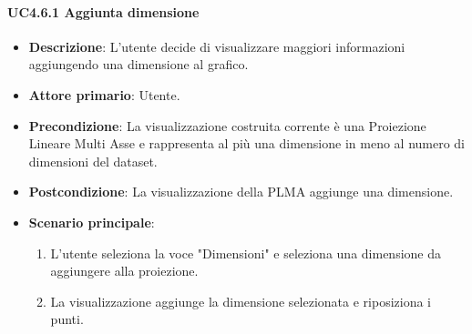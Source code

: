 \paragraph{UC4.6.1 Aggiunta dimensione}
\label{par:uc4.6.1}
\begin{itemize}
    \item \textbf{Descrizione}: L’utente decide di visualizzare maggiori informazioni
                                aggiungendo una dimensione al grafico.

    \item \textbf{Attore primario}: Utente.
    
    \item \textbf{Precondizione}:   La visualizzazione costruita corrente è una Proiezione Lineare Multi Asse
                                    e rappresenta al più una dimensione in meno al numero di dimensioni del dataset.
    \item \textbf{Postcondizione}:  La visualizzazione della PLMA aggiunge una dimensione.

	\item \textbf{Scenario principale}:
        \begin{enumerate}
            \item L'utente seleziona la voce "Dimensioni" e seleziona una dimensione da aggiungere alla proiezione.
            \item La visualizzazione aggiunge la dimensione selezionata e riposiziona i punti.
           
        \end{enumerate}
\end{itemize}


